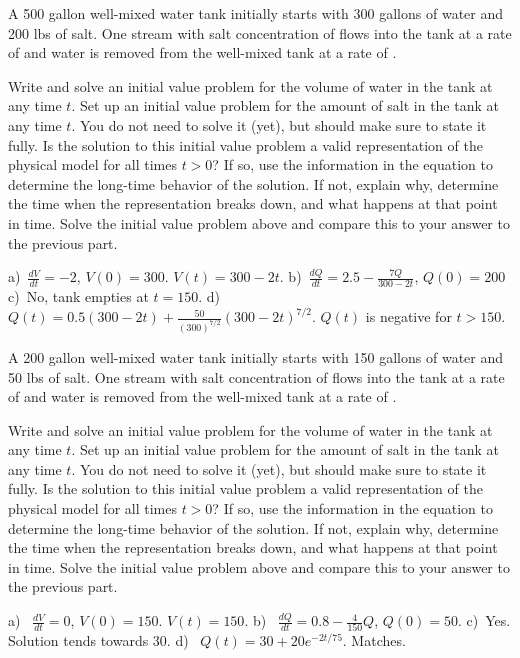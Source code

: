 \begin{exercise}
A 500 gallon well-mixed water tank initially starts with 300 gallons of water and 200 lbs of salt. One stream with salt concentration of  flows into the tank at a rate of  and water is removed from the well-mixed tank at a rate of .
\begin{tasks}
\task Write and solve an initial value problem for the volume of water in the tank at any time $t$.
\task Set up an initial value problem for the amount of salt in the tank at any time $t$. You do not need to solve it (yet), but should make sure to state it fully.
\task Is the solution to this initial value problem a valid representation of the physical model for all times $t > 0$? If so, use the information in the equation to determine the long-time behavior of the solution. If not, explain why, determine the time when the representation breaks down, and what happens at that point in time.
\task Solve the initial value problem above and compare this to your answer to the previous part.
\end{tasks}
\end{exercise}
\comboSol{%
}
{%
a)~$\frac{dV}{dt} = -2$, $V(0) = 300$. $V(t) = 300-2t$.\quad
b)~$\frac{dQ}{dt} = 2.5 - \frac{7Q}{300-2t}$, $Q(0) = 200$ \quad
c)~No, tank empties at $t = 150$. \quad
d)~$Q(t) = 0.5(300-2t) + \frac{50}{(300)^{7/2}}(300-2t)^{7/2}$. $Q(t)$ is negative for $t > 150$. 
}

\begin{exercise}
A 200 gallon well-mixed water tank initially starts with 150 gallons of water and 50 lbs of salt. One stream with salt concentration of  flows into the tank at a rate of  and water is removed from the well-mixed tank at a rate of .
\begin{tasks}
\task Write and solve an initial value problem for the volume of water in the tank at any time $t$.
\task Set up an initial value problem for the amount of salt in the tank at any time $t$. You do not need to solve it (yet), but should make sure to state it fully.
\task Is the solution to this initial value problem a valid representation of the physical model for all times $t > 0$? If so, use the information in the equation to determine the long-time behavior of the solution. If not, explain why, determine the time when the representation breaks down, and what happens at that point in time.
\task Solve the initial value problem above and compare this to your answer to the previous part.
\end{tasks}
\end{exercise}
\comboSol{%
}
{%
a)~ $\frac{dV}{dt} = 0$, $V(0) = 150$. $V(t) = 150$.\quad
b)~ $\frac{dQ}{dt} = 0.8 - \frac{4}{150}Q$, $Q(0) = 50$.\quad
c)~Yes. Solution tends towards 30.\quad
d)~ $Q(t) = 30 + 20e^{-2t/75}$. Matches.
}

